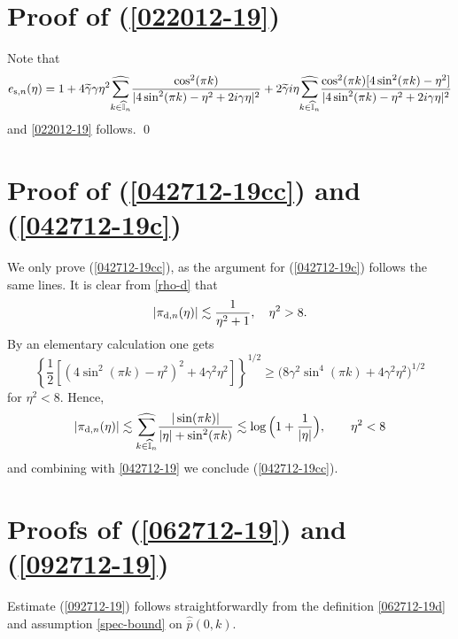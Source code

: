 \documentclass[EJP]{ejpecp} %
\newcommand\T{{\mathbb I}}
\newcommand \ga{\gamma}
\renewcommand{\ge}{\geqslant}
\renewcommand{\hat}{\widehat}
\renewcommand{\tilde}{\widetilde}
\renewcommand{\bar}{\overline}
\numberwithin{equation}{section}
\begin{document}
\section{Proof of (\ref{022012-19})}

\label{sec:app3}


Note that
\begin{align*}
e_{{\rm s},n}(\eta) 
=1+4 \tilde\ga \ga\eta^2\underset{{k\in \widehat{\T}_n}}{{\hat\sum}}\frac{\cos^2(\pi k)}{|4\sin^2(\pi
  k)-\eta^2+2i\ga\eta|^2}
+2 \tilde\ga i\eta\underset{{k\in \widehat{\T}_n}}{{\hat\sum}}\frac{\cos^2(\pi k) [4\sin^2(\pi k)-\eta^2]}{|4\sin^2(\pi k)-\eta^2+2i\ga\eta|^2}
\end{align*}
and \eqref{022012-19} follows.
\qed





\section{Proof of (\ref{042712-19cc}) and  (\ref{042712-19c})}

\label{sec:app4}


We only prove  (\ref{042712-19cc}), as the argument for
(\ref{042712-19c}) follows the same lines.
It is clear from \eqref{rho-d} that 
\begin{align}
\label{042712-19}
 |\pi_{{\rm d},n}(\eta)|\lesssim \frac{1}{\eta^2+1},\quad \eta^2>8.
\end{align}
By an elementary calculation one gets
$$
\left\{\frac{1}{2}\left[(4\sin^2(\pi  k)-\eta^2)^2+4\ga^2 \eta^2\right]\right\}^{1/2} \ge
 \big(8\ga^2\sin^4(\pi k)+4\ga^2 \eta^2\big)^{1/2} 
$$
for $\eta^2<8$.
Hence,
$$
 |\pi_{{\rm d},n}(\eta)|\lesssim  \underset{{k\in \widehat{\T}_n}}{{\hat\sum}}\frac{|\sin(\pi
  k)|}{|\eta|+\sin^2(\pi k)}\lesssim \log\Big(1+\frac{1}{|\eta|}\Big),\qquad \eta^2<8
$$
and combining with \eqref{042712-19} we conclude (\ref{042712-19cc}).



\section{Proofs of (\ref{062712-19}) and (\ref{092712-19})}

\label{sec:app5}


Estimate
(\ref{092712-19}) follows straightforwardly from the definition
\eqref{062712-19d}
and assumption \eqref{spec-bound} on $\hat {\bar p}(0,k)$.
\end{document}
